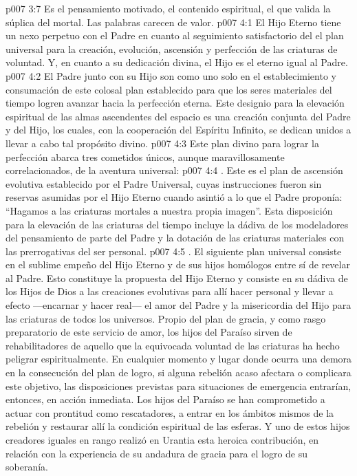 \vs p007 3:7 Es el pensamiento motivado, el contenido espiritual, el que valida la súplica del mortal. Las palabras carecen de valor.
\vs p007 4:1 El Hijo Eterno tiene un nexo perpetuo con el Padre en cuanto al seguimiento satisfactorio del  el plan universal para la creación, evolución, ascensión y perfección de las criaturas de voluntad. Y, en cuanto a su dedicación divina, el Hijo es el eterno igual al Padre.
\vs p007 4:2 El Padre junto con su Hijo son como uno solo en el establecimiento y consumación de este colosal plan establecido para que los seres materiales del tiempo logren avanzar hacia la perfección eterna. Este designio para la elevación espiritual de las almas ascendentes del espacio es una creación conjunta del Padre y del Hijo, los cuales, con la cooperación del Espíritu Infinito, se dedican unidos a llevar a cabo tal propósito divino.
\vs p007 4:3 \pc Este plan divino para lograr la perfección abarca tres cometidos únicos, aunque maravillosamente correlacionados, de la aventura universal:
\vs p007 4:4 . Este es el plan de ascensión evolutiva establecido por el Padre Universal, cuyas instrucciones fueron sin reservas asumidas por el Hijo Eterno cuando asintió a lo que el Padre proponía: “Hagamos a las criaturas mortales a nuestra propia imagen”. Esta disposición para la elevación de las criaturas del tiempo incluye la dádiva de los modeladores del pensamiento de parte del Padre y la dotación de las criaturas materiales con las prerrogativas del ser personal.
\vs p007 4:5 . El siguiente plan universal consiste en el sublime empeño del Hijo Eterno y de sus hijos homólogos entre sí de revelar al Padre. Esto constituye la propuesta del Hijo Eterno y consiste en su dádiva de los Hijos de Dios a las creaciones evolutivas para allí hacer personal y llevar a efecto ---encarnar y hacer real--- el amor del Padre y la misericordia del Hijo para las criaturas de todos los universos. Propio del plan de gracia, y como rasgo preparatorio de este servicio de amor, los hijos del Paraíso sirven de rehabilitadores de aquello que la equivocada voluntad de las criaturas ha hecho peligrar espiritualmente. En cualquier momento y lugar donde ocurra una demora en la consecución del plan de logro, si alguna rebelión acaso afectara o complicara este objetivo, las disposiciones previstas para situaciones de emergencia entrarían, entonces, en acción inmediata. Los hijos del Paraíso se han comprometido a actuar con prontitud como rescatadores, a entrar en los ámbitos mismos de la rebelión y restaurar allí la condición espiritual de las esferas. Y uno de estos hijos creadores iguales en rango realizó en Urantia esta heroica contribución, en relación con la experiencia de su andadura de gracia para el logro de su soberanía.
